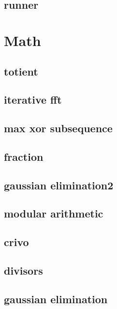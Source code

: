 \subsection{runner}
\raggedbottom
\hrulefill

\section{Math}
\subsection{totient}
\raggedbottom
\hrulefill
\subsection{iterative fft}
\raggedbottom
\hrulefill
\subsection{max xor subsequence}
\raggedbottom
\hrulefill
\subsection{fraction}
\raggedbottom
\hrulefill
\subsection{gaussian elimination2}
\raggedbottom
\hrulefill
\subsection{modular arithmetic}
\raggedbottom
\hrulefill
\subsection{crivo}
\raggedbottom
\hrulefill
\subsection{divisors}
\raggedbottom
\hrulefill
\subsection{gaussian elimination}
\raggedbottom
\hrulefill
